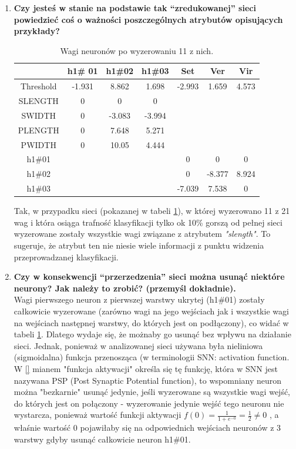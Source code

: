 \begin{enumerate}
\item \textbf{
Czy jesteś w stanie na podstawie tak “zredukowanej” sieci powiedzieć coś o ważności poszczególnych atrybutów opisujących przykłady?}

\begin{table}[ch]
	\centering
	\caption{Wagi neuronów po wyzerowaniu 11 z nich.\label{tab:zeroweights}}
	\begin{tabular}{|c|c|c|c|c|c|c|}
		\hline  & h1\# 01 & h1\#02 & h1\#03 & Set & Ver & Vir \\
		\hline Threshold & -1.931 & 8.862 & 1.698 & -2.993 & 1.659 & 4.573 \\
		\hline SLENGTH & 0 & 0 & 0 &  &  & \\
		\hline SWIDTH & 0 & -3.083 & -3.994 &  &  &  \\
		\hline PLENGTH & 0 & 7.648 & 5.271 &  &  &  \\
		\hline PWIDTH & 0 & 10.05 & 4.444 &  &  &  \\
		\hline h1\#01 &  &  &  & 0 & 0 & 0\\
		\hline h1\#02 &  &  &  & 0 & -8.377 & 8.924 \\
		\hline h1\#03 &  &  &  & -7.039 & 7.538 & 0 \\
		\hline
	\end{tabular}
\end{table}


Tak, w przypadku sieci (pokazanej w tabeli \ref{tab:zeroweights}), w której wyzerowano 11 z 21 wag i która osiąga trafność klasyfikacji tylko ok 10\% gorszą od pełnej sieci wyzerowane zostały wszystkie wagi związane z atrybutem \emph{"slength"}. To sugeruje, że atrybut ten nie niesie wiele informacji z punktu widzenia przeprowadzanej klasyfikacji.

\item \textbf{
Czy w konsekwencji “przerzedzenia” sieci można usunąć niektóre neurony? Jak należy to zrobić?
 (przemyśl dokładnie).}
 \\Wagi pierwszego neuron z pierwszej warstwy ukrytej (h1\#01) zostały całkowicie wyzerowane (zarówno wagi na jego wejściach jak i wszystkie wagi na wejściach następnej warstwy, do których jest on podłączony), co widać w tabeli \ref{tab:zeroweights}. Dlatego wydaje się, że możnaby go usunąć bez wpływu na działanie sieci. Jednak, ponieważ w analizowanej sieci używana była nieliniowa (sigmoidalna) funkcja przenosząca (w terminologii SNN: activation function. W \ref{} mianem "funkcja aktywacji" określa się tę funkcję, która w SNN jest nazywana PSP (Post Synaptic Potential function), to wspomniany neuron można "bezkarnie" usunąć jedynie, jeśli wyzerowane są wszystkie wagi wejść, do których jest on połączony - wyzerowanie jedynie wejść tego neuronu nie wystarcza, ponieważ wartość funkcji aktywacji $ f(0) = \frac{1}{1 + e^{-0}} = \frac{1}{2} \neq 0 $ , a właśnie wartość 0 pojawiłaby się na odpowiednich wejściach neuronów z 3 warstwy gdyby usunąć całkowicie neuron h1\#01.
\end{enumerate}

